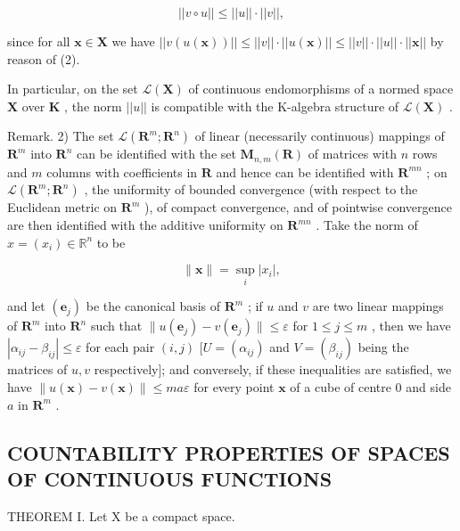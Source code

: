 \[
\left| \left| v \circ u \right| \right| \leqslant \left| \left| u \right| \right| \cdot \left| \left| v \right| \right|,\tag{3}
\]

since for all \(\pmb{x} \in \mathbf{X}\) we have \(||v(u(\pmb{x}))|| \leqslant ||v|| \cdot ||u(\pmb{x})|| \leqslant ||v|| \cdot ||u|| \cdot ||\pmb{x}||\) by reason of (2).

In particular, on the set \(\mathcal{L}(\mathbf{X})\) of continuous endomorphisms of a normed space \(\mathbf{X}\) over \(\mathbf{K}\) , the norm \(||u||\) is compatible with the K-algebra structure of \(\mathcal{L}(\mathbf{X})\) .

Remark. 2) The set \(\mathcal{L}(\mathbf{R}^{m};\mathbf{R}^{n})\) of linear (necessarily continuous) mappings of \(\mathbf{R}^{m}\) into \(\mathbf{R}^{n}\) can be identified with the set \(\mathbf{M}_{n,m}(\mathbf{R})\) of matrices with \(n\) rows and \(m\) columns with coefficients in \(\mathbf{R}\) and hence can be identified with \(\mathbf{R}^{mn}\) ; on \(\mathcal{L}(\mathbf{R}^{m};\mathbf{R}^{n})\) , the uniformity of bounded convergence (with respect to the Euclidean metric on \(\mathbf{R}^{m}\) ), of compact convergence, and of pointwise convergence are then identified with the additive uniformity on \(\mathbf{R}^{mn}\) . Take the norm of \(x = (x_{i})\in \mathbb{R}^{n}\) to be

\[
\| \boldsymbol {x} \| = \sup _ {i} | x _ {i} |,
\]

and let \((\pmb{e}_j)\) be the canonical basis of \(\mathbf{R}^m\) ; if \(u\) and \(v\) are two linear mappings of \(\mathbf{R}^m\) into \(\mathbf{R}^n\) such that \(\| u(\pmb{e}_j) - v(\pmb{e}_j)\| \leqslant \varepsilon\) for \(1 \leqslant j \leqslant m\) , then we have \(|\alpha_{ij} - \beta_{ij}| \leqslant \varepsilon\) for each pair \((i,j)\) \([U = (\alpha_{ij})\) and \(V = (\beta_{ij})\) being the matrices of \(u, v\) respectively{]}; and conversely, if these inequalities are satisfied, we have \(\| u(\pmb{x}) - v(\pmb{x})\| \leqslant ma\varepsilon\) for every point \(\pmb{x}\) of a cube of centre 0 and side \(a\) in \(\mathbf{R}^m\) .

\subsection{COUNTABILITY PROPERTIES OF SPACES OF CONTINUOUS FUNCTIONS}

THEOREM I. Let X be a compact space.

